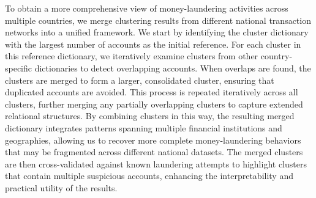 To obtain a more comprehensive view of money-laundering activities across multiple countries, we merge clustering results from different national transaction networks into a unified framework. We start by identifying the cluster dictionary with the largest number of accounts as the initial reference. For each cluster in this reference dictionary, we iteratively examine clusters from other country-specific dictionaries to detect overlapping accounts. When overlaps are found, the clusters are merged to form a larger, consolidated cluster, ensuring that duplicated accounts are avoided. This process is repeated iteratively across all clusters, further merging any partially overlapping clusters to capture extended relational structures. By combining clusters in this way, the resulting merged dictionary integrates patterns spanning multiple financial institutions and geographies, allowing us to recover more complete money-laundering behaviors that may be fragmented across different national datasets. The merged clusters are then cross-validated against known laundering attempts to highlight clusters that contain multiple suspicious accounts, enhancing the interpretability and practical utility of the results.

